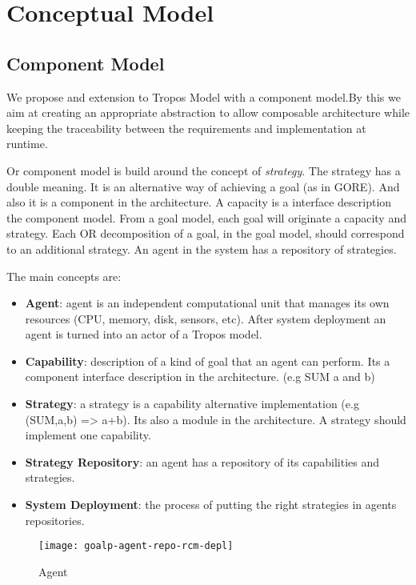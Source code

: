 \section{Conceptual Model}
\label{conceptual_model}

\subsection{Component Model}

We propose and extension to Tropos Model with a component model.By this we aim at creating an appropriate abstraction to allow composable architecture while keeping the traceability between the requirements and implementation at runtime.

Or component model is build around the concept of \textit{strategy}. The strategy has a double meaning. It is an alternative way of achieving a goal (as in GORE). And also it is a component in the architecture. A capacity is a interface description the component model.
From a goal model, each goal will originate a capacity and strategy. Each OR decomposition of a goal, in the goal model, should correspond to an additional strategy.
An agent in the system has a repository of strategies.

The main concepts are:

\begin{itemize}
  \item \textbf{Agent}: agent is an independent computational unit that manages its own resources (CPU, memory, disk, sensors, etc). After system deployment an agent is turned into an actor of a Tropos model.
  \item \textbf{Capability}: description of a kind of goal that an agent can perform. Its a component interface description in the architecture. (e.g SUM a and b)
  \item \textbf{Strategy}: a strategy is a capability alternative implementation (e.g (SUM,a,b) => {a+b}). Its also a module in the architecture. A strategy should implement one capability.
  \item \textbf{Strategy Repository}: an agent has a repository of its capabilities and strategies.
  \item \textbf{System Deployment}: the process of putting the right strategies in agents repositories.
\end{itemize}

\begin{figure}
  \centering
  \texttt{[image: goalp-agent-repo-rcm-depl]}
  \caption{Agent}
  \label{fig:goalp-agent}
\end{figure}

